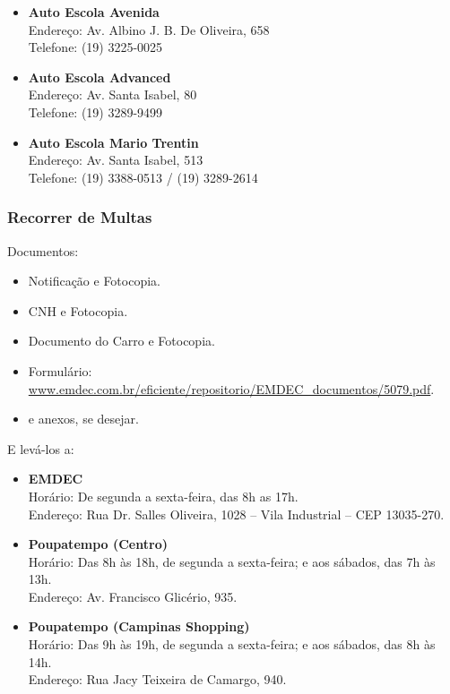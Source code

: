 \begin{itemize}
    \item  \textbf{Auto Escola Avenida}
        \\Endereço: Av. Albino J. B. De Oliveira, 658
        \\Telefone: (19) 3225-0025

    \item  \textbf{Auto Escola Advanced}
        \\Endereço: Av. Santa Isabel, 80
        \\Telefone: (19) 3289-9499

    \item  \textbf{Auto Escola Mario Trentin}
        \\Endereço: Av. Santa Isabel, 513
        \\Telefone: (19) 3388-0513 / (19) 3289-2614
\end{itemize}

\subsubsection*{Recorrer de Multas}

Documentos:
\begin{itemize}
    \item  Notificação e Fotocopia.
    \item  CNH e Fotocopia.
    \item  Documento do Carro e Fotocopia.
    \item  Formulário: \url{www.emdec.com.br/eficiente/repositorio/EMDEC_documentos/5079.pdf}.
    \item  e anexos, se desejar.
\end{itemize}

E levá-los a:
\begin{itemize}
    \item   \textbf{EMDEC}
        \\Horário: De segunda a sexta-feira, das 8h as 17h.
        \\Endereço: Rua Dr. Salles Oliveira, 1028 -- Vila Industrial -- CEP 13035-270.
    \item   \textbf{Poupatempo (Centro)}
        \\Horário: Das 8h às 18h, de segunda a sexta-feira; e aos sábados, das 7h às 13h.
        \\Endereço: Av. Francisco Glicério, 935.
    \item   \textbf{Poupatempo (Campinas Shopping)}
        \\Horário: Das 9h às 19h, de segunda a sexta-feira; e aos sábados, das 8h às 14h.
        \\Endereço: Rua Jacy Teixeira de Camargo, 940.
\end{itemize}

